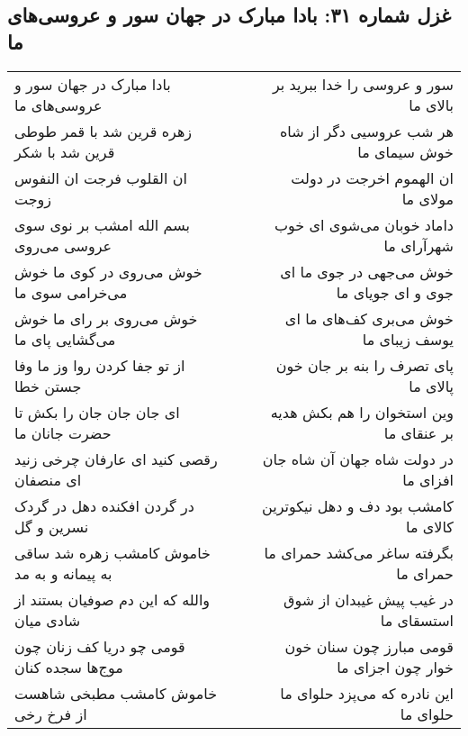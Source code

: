 \begin{center}
\section*{غزل شماره ۳۱: بادا مبارک در جهان سور و عروسی‌های ما}
\label{sec:0031}
\begin{longtable}{l p{0.5cm} r}
بادا مبارک در جهان سور و عروسی‌های ما
&&
سور و عروسی را خدا ببرید بر بالای ما
\\
زهره قرین شد با قمر طوطی قرین شد با شکر
&&
هر شب عروسیی دگر از شاه خوش سیمای ما
\\
ان القلوب فرجت ان النفوس زوجت
&&
ان الهموم اخرجت در دولت مولای ما
\\
بسم الله امشب بر نوی سوی عروسی می‌روی
&&
داماد خوبان می‌شوی ای خوب شهرآرای ما
\\
خوش می‌روی در کوی ما خوش می‌خرامی سوی ما
&&
خوش می‌جهی در جوی ما ای جوی و ای جویای ما
\\
خوش می‌روی بر رای ما خوش می‌گشایی پای ما
&&
خوش می‌بری کف‌های ما ای یوسف زیبای ما
\\
از تو جفا کردن روا وز ما وفا جستن خطا
&&
پای تصرف را بنه بر جان خون پالای ما
\\
ای جان جان جان را بکش تا حضرت جانان ما
&&
وین استخوان را هم بکش هدیه بر عنقای ما
\\
رقصی کنید ای عارفان چرخی زنید ای منصفان
&&
در دولت شاه جهان آن شاه جان افزای ما
\\
در گردن افکنده دهل در گردک نسرین و گل
&&
کامشب بود دف و دهل نیکوترین کالای ما
\\
خاموش کامشب زهره شد ساقی به پیمانه و به مد
&&
بگرفته ساغر می‌کشد حمرای ما حمرای ما
\\
والله که این دم صوفیان بستند از شادی میان
&&
در غیب پیش غیبدان از شوق استسقای ما
\\
قومی چو دریا کف زنان چون موج‌ها سجده کنان
&&
قومی مبارز چون سنان خون خوار چون اجزای ما
\\
خاموش کامشب مطبخی شاهست از فرخ رخی
&&
این نادره که می‌پزد حلوای ما حلوای ما
\\
\end{longtable}
\end{center}
